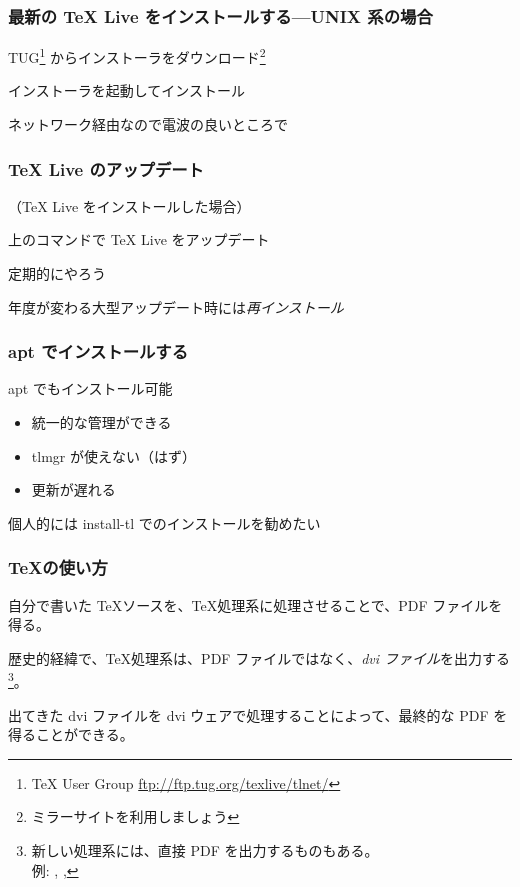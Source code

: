 \begin{frame}
	\frametitle{最新の {\TeX} Live をインストールする---UNIX 系の場合}
	TUG\footnote{{\TeX} User Group \url{ftp://ftp.tug.org/texlive/tlnet/}}
	からインストーラをダウンロード\footnote{ミラーサイトを利用しましょう}\\
	
	インストーラを起動してインストール\\
	
	ネットワーク経由なので電波の良いところで
\end{frame}

\begin{frame}
	\frametitle{{\TeX} Live のアップデート}
	（{\TeX} Live をインストールした場合）
	
	
	上のコマンドで {\TeX} Live をアップデート
	
	定期的にやろう
	
	年度が変わる大型アップデート時には\emph{再インストール}
\end{frame}

\begin{frame}
	\frametitle{apt でインストールする}
	
	apt でもインストール可能
	
	\begin{itemize}
		\item 統一的な管理ができる
		\item tlmgr が使えない（はず）
		\item 更新が遅れる
	\end{itemize}
	
	個人的には install-tl でのインストールを勧めたい
\end{frame}


\begin{frame}
	\frametitle{\TeX の使い方}
	自分で書いた \TeX ソースを、\TeX 処理系に処理させることで、PDF ファイルを得る。\par
	\pause
	\par
	\pause
	歴史的経緯で、\TeX 処理系は、PDF ファイルではなく、\emph{dvi ファイル}を出力する
	\footnote{新しい処理系には、直接 PDF を出力するものもある。\\例: \pdfTeX, \LuaTeX, \XeTeX}。
	
	出てきた dvi ファイルを dvi ウェアで処理することによって、最終的な PDF を得ることができる。
\end{frame}

